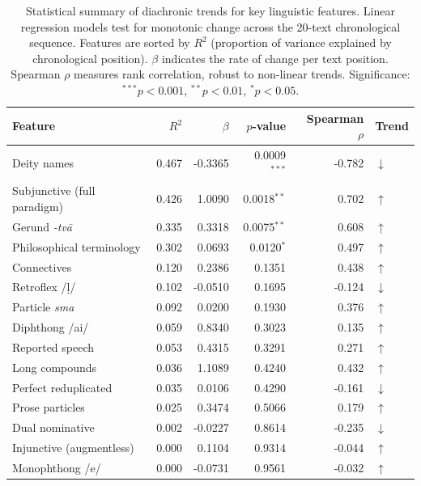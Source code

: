 \begin{table}[ht]
\centering
\caption{Statistical summary of diachronic trends for key linguistic features. Linear regression models test for monotonic change across the 20-text chronological sequence. Features are sorted by $R^2$ (proportion of variance explained by chronological position). $\beta$ indicates the rate of change per text position. Spearman $\rho$ measures rank correlation, robust to non-linear trends. Significance: $^{***}p < 0.001$, $^{**}p < 0.01$, $^{*}p < 0.05$.}
\label{tab:feature-statistics}
\begin{tabular}{lrrrrl}
\toprule
\textbf{Feature} & \textbf{$R^2$} & \textbf{$\beta$} & \textbf{$p$-value} & \textbf{Spearman $\rho$} & \textbf{Trend} \\
\midrule
Deity names & 0.467 & -0.3365 & 0.0009$^{***}$ & -0.782 & $\downarrow$ \\
Subjunctive (full paradigm) & 0.426 & 1.0090 & 0.0018$^{**}$ & 0.702 & $\uparrow$ \\
Gerund \textit{-tvā} & 0.335 & 0.3318 & 0.0075$^{**}$ & 0.608 & $\uparrow$ \\
Philosophical terminology & 0.302 & 0.0693 & 0.0120$^{*}$ & 0.497 & $\uparrow$ \\
Connectives & 0.120 & 0.2386 & 0.1351 & 0.438 & $\uparrow$ \\
Retroflex /ḷ/ & 0.102 & -0.0510 & 0.1695 & -0.124 & $\downarrow$ \\
Particle \textit{sma} & 0.092 & 0.0200 & 0.1930 & 0.376 & $\uparrow$ \\
Diphthong /ai/ & 0.059 & 0.8340 & 0.3023 & 0.135 & $\uparrow$ \\
Reported speech & 0.053 & 0.4315 & 0.3291 & 0.271 & $\uparrow$ \\
Long compounds & 0.036 & 1.1089 & 0.4240 & 0.432 & $\uparrow$ \\
Perfect reduplicated & 0.035 & 0.0106 & 0.4290 & -0.161 & $\downarrow$ \\
Prose particles & 0.025 & 0.3474 & 0.5066 & 0.179 & $\uparrow$ \\
Dual nominative & 0.002 & -0.0227 & 0.8614 & -0.235 & $\downarrow$ \\
Injunctive (augmentless) & 0.000 & 0.1104 & 0.9314 & -0.044 & $\uparrow$ \\
Monophthong /e/ & 0.000 & -0.0731 & 0.9561 & -0.032 & $\uparrow$ \\
\bottomrule
\end{tabular}
\end{table}